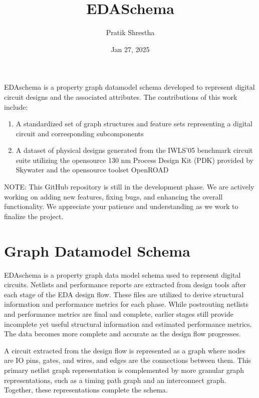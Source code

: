 \documentclass[letterpaper,10pt,english]{sphinxmanual}
\title{EDA\sphinxhyphen{}Schema}
\date{Jan 27, 2025}
\author{Pratik Shrestha}
\begin{document}
\pagestyle{empty}
\sphinxmaketitle
\pagestyle{plain}
\sphinxtableofcontents
\pagestyle{normal}
\label{\detokenize{index::doc}}


\sphinxAtStartPar
EDA\sphinxhyphen{}schema is a property graph datamodel schema developed to represent digital circuit designs and the associated attributes.
The contributions of this work include:
\begin{enumerate}
%
\item {} 
\sphinxAtStartPar
A standardized set of graph structures and feature sets representing a digital circuit and corresponding subcomponents

\item {} 
\sphinxAtStartPar
A dataset of physical designs generated from the IWLS’05 benchmark circuit suite utilizing the open\sphinxhyphen{}source 130 nm Process Design Kit (PDK) provided by Skywater and the open\sphinxhyphen{}source toolset OpenROAD

\end{enumerate}

\sphinxAtStartPar
NOTE: This GitHub repository is still in the development phase. We are actively working on adding new features, fixing bugs, and enhancing the overall functionality. We appreciate your patience and understanding as we work to finalize the project.


\chapter{Graph Datamodel Schema}
\label{\detokenize{index:graph-datamodel-schema}}
\sphinxAtStartPar
EDA\sphinxhyphen{}schema is a property graph data model schema used to represent digital circuits. Netlists and performance reports are extracted from design tools after each stage of the EDA design flow. These files are utilized to derive structural information and performance metrics for each phase. While post\sphinxhyphen{}routing netlists and performance metrics are final and complete, earlier stages still provide incomplete yet useful structural information and estimated performance metrics. The data becomes more complete and accurate as the design flow progresses.

\sphinxAtStartPar
A circuit extracted from the design flow is represented as a graph where nodes are IO pins, gates, and wires, and edges are the connections between them. This primary netlist graph representation is complemented by more granular graph representations, such as a timing path graph and an interconnect graph. Together, these representations complete the schema.
\end{document}

